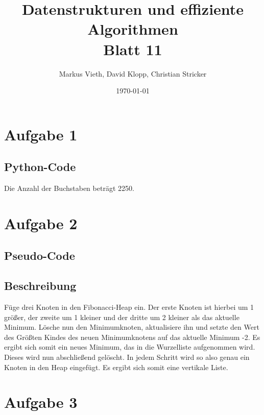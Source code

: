 \documentclass[a4paper,11pt,twoside]{scrartcl}
\title{Datenstrukturen und effiziente Algorithmen\\ Blatt 11}
\author{Markus Vieth, David Klopp, Christian Stricker}
\date{\today}
\begin{document}
\maketitle
\cleardoublepage
\pagestyle{myheadings}

\section*{Aufgabe 1}
\subsection*{Python-Code}


Die Anzahl der Buchstaben beträgt 2250.



\section*{Aufgabe 2}

\subsection*{Pseudo-Code}


\subsection*{Beschreibung}
Füge drei Knoten in den Fibonacci-Heap ein. Der erste Knoten ist hierbei um 1 größer, der zweite um 1 kleiner und der dritte um 2 kleiner als das aktuelle Minimum. Lösche nun den Minimumknoten, aktualisiere ihn und setzte den Wert des Größten Kindes des neuen Minimumknotens auf das aktuelle Minimum -2. Es ergibt sich somit ein neues Minimum, das in die Wurzelliste aufgenommen wird. Dieses wird nun abschließend gelöscht. In jedem Schritt wird so also genau ein Knoten in den Heap eingefügt. Es ergibt sich somit eine vertikale Liste.


\pagebreak

\section*{Aufgabe 3}
\end{document}

